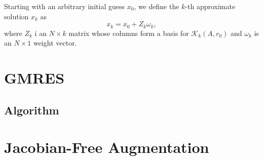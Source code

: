 \documentclass[Prelim,12pt]{WisconsinThesis}
\newcommand{\by}    {\!\times\!}
\begin{document}
Starting with an arbitrary initial guess $x_0$, we define the $k$-th approximate solution $x_k$ as
\begin{equation}
    x_k = x_0 + Z_k \omega_k,
\end{equation}
where $Z_k$ i an $N \by k$ matrix whose columns form a basis for $\mathcal{K}_k(A,r_0)$ and $\omega_k$ is an $N \by 1$ weight vector.



\section{GMRES}
\subsection{Algorithm}


\section{Jacobian-Free Augmentation}
\end{document}

